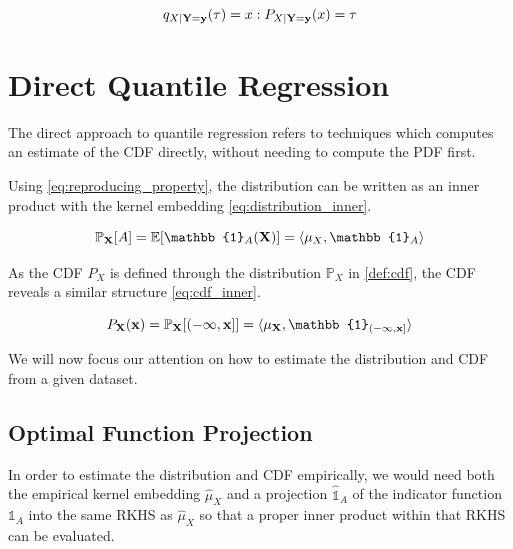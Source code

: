 \documentclass[twoside]{article} \usepackage{aistats2017}
\theoremstyle{definition}
\theoremstyle{theorem}
\newcommand{\rv}[1]{{#1}}
\begin{document}
		\begin{equation}
			q_{\rv{X} | \bvec{\rv{Y}} = \bvec{y}}(\tau) = x : P_{\rv{X} | \bvec{\rv{Y}} = \bvec{y}}(x) = \tau
		\label{eq:quantile_root_finding}
		\end{equation}	
	
\section{Direct Quantile Regression}
\label{sec:direct_quantile_regression}

	The direct approach to quantile regression refers to techniques which computes an estimate of the CDF directly, without needing to compute the PDF first.
	
	Using \eqref{eq:reproducing_property}, the distribution can be written as an inner product with the kernel embedding \eqref{eq:distribution_inner}.
		
	\begin{equation}
		\mathbb{P}_{\bvec{\rv{X}}}[A] = \mathbb{E}[\mathbb{1}_{A}(\bvec{\rv{X}})] = \langle \mu_{\rv{X}}, \mathbb{1}_{A} \rangle
	\label{eq:distribution_inner}
	\end{equation}

	As the CDF $P_{\rv{X}}$ is defined through the distribution $\mathbb{P}_{\rv{X}}$ in \cref{def:cdf}, the CDF reveals a similar structure \eqref{eq:cdf_inner}.
			
	\begin{equation}
		P_{\bvec{\rv{X}}}(\bvec{x}) = \mathbb{P}_{\bvec{\rv{X}}}[(-\bvec{\infty}, \bvec{x}]] = \langle \mu_{\bvec{\rv{X}}}, \mathbb{1}_{(-\bvec{\infty}, \bvec{x}]} \rangle
	\label{eq:cdf_inner}
	\end{equation}

	We will now focus our attention on how to estimate the distribution and CDF from a given dataset.
	
	\subsection{Optimal Function Projection}
	\label{sec:direct_quantile_regression:optimal_function_approximation}
	
		In order to estimate the distribution and CDF empirically, we would need both the empirical kernel embedding $\hat{\mu}_{\rv{X}}$ and a projection $\hat{\mathbb{1}}_{A}$ of the indicator function $\mathbb{1}_{A}$ into the same RKHS as $\hat{\mu}_{\rv{X}}$ so that a proper inner product within that RKHS can be evaluated.
\end{document}
